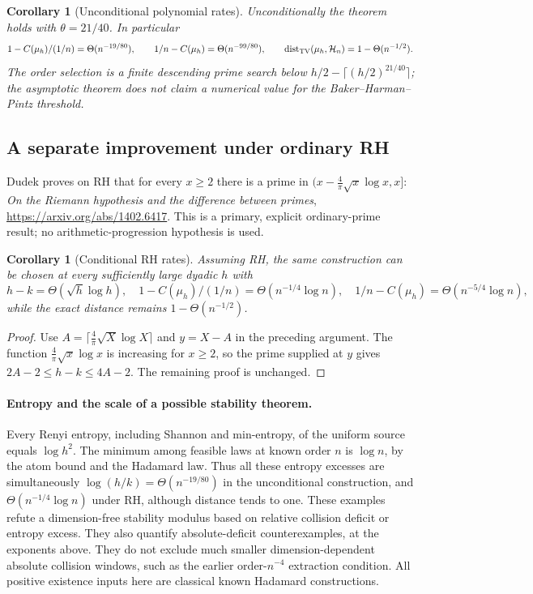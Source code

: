 \documentclass[11pt]{article}
\newtheorem{corollary}[theorem]{Corollary}
\begin{document}
\begin{corollary}[Unconditional polynomial rates]
\label{cor:stability-bhp-rate}
Unconditionally the theorem holds with $\theta=21/40$. In particular
\[
 1-C(\mu_h)/(1/n)=\Theta(n^{-19/80}),\qquad
 1/n-C(\mu_h)=\Theta(n^{-99/80}),\qquad
 \operatorname{dist}_{\rm TV}(\mu_h,\mathcal H_n)=1-\Theta(n^{-1/2}).
\]
The order selection is a finite descending prime search below
$h/2-\lceil(h/2)^{21/40}\rceil$; the asymptotic theorem does not claim
a numerical value for the Baker--Harman--Pintz threshold.
\end{corollary}

\subsection{A separate improvement under ordinary RH}
Dudek proves on RH that for every $x\ge2$ there is a prime in
$(x-\frac4\pi\sqrt{x}\log x,x]$:
\emph{On the Riemann hypothesis and the difference between primes},
\url{https://arxiv.org/abs/1402.6417}. This is a primary, explicit
ordinary-prime result; no arithmetic-progression hypothesis is used.
\begin{corollary}[Conditional RH rates]\label{cor:stability-rh-rate}
Assuming RH, the same construction can be chosen at every sufficiently
large dyadic $h$ with
\[
 h-k=\Theta(\sqrt h\log h),\quad
 1-C(\mu_h)/(1/n)=\Theta(n^{-1/4}\log n),\quad
 1/n-C(\mu_h)=\Theta(n^{-5/4}\log n),
\]
while the exact distance remains $1-\Theta(n^{-1/2})$.
\end{corollary}
\begin{proof}
Use $A=\lceil\frac4\pi\sqrt X\log X\rceil$ and $y=X-A$ in the
preceding argument. The function $\frac4\pi\sqrt x\log x$ is increasing
for $x\ge2$, so the prime supplied at $y$ gives
$2A-2\le h-k\le4A-2$. The remaining proof is unchanged.
\end{proof}

\paragraph{Entropy and the scale of a possible stability theorem.}
Every Renyi entropy, including Shannon and min-entropy, of the uniform
source equals $\log h^2$. The minimum among feasible laws at known order
$n$ is $\log n$, by the atom bound and the Hadamard law. Thus all these
entropy excesses are simultaneously
$\log(h/k)=\Theta(n^{-19/80})$ in the unconditional construction,
and $\Theta(n^{-1/4}\log n)$ under RH, although distance tends to one.
These examples refute a dimension-free stability modulus based on relative
collision deficit or entropy excess. They also quantify absolute-deficit
counterexamples, at the exponents above. They do not exclude much smaller
dimension-dependent absolute collision windows, such as the earlier
order-$n^{-4}$ extraction condition. All positive existence inputs here
are classical known Hadamard constructions.
\end{document}
